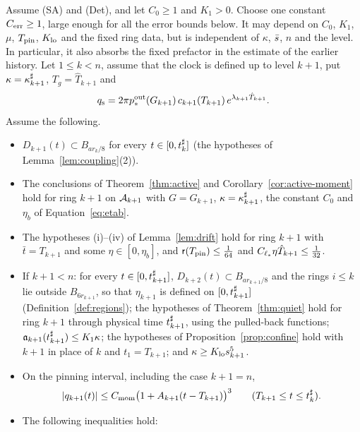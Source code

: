 \begin{lemma}
\label{lem:kicktrue}
Assume (SA) and (Det), and let $C_0\ge1$ and $K_1>0$.
Choose one constant $C_{\mathrm{err}}\ge1$, large enough for all the error bounds below.
It may depend on $C_0$, $K_1$, $\mu$, $T_{\mathrm{pin}}$, $K_{\mathrm{lo}}$ and the fixed ring data,
but is independent of $\kappa$, $\bar s$, $n$ and the level. In particular, it
also absorbs the fixed prefactor in the estimate of the earlier history.
Let $1\le k<n$, assume that
the clock is defined up to level $k+1$, put $\kappa=\kappa^\sharp_{k+1}$,
$T_g=\hat T_{k+1}$ and
\begin{equation}
\label{eq:kicktrue-moment}
q_{\mathrm{s}}=2\pi p^{\mathrm{out}}_*(G_{k+1})\,c_{k+1}(T_{k+1})\,e^{\lambda_{k+1}\hat T_{k+1}} .
\end{equation}
Assume the following.
\begin{itemize}
\item $D_{k+1}(t)\subset B_{ar_k/8}$ for every $t\in[0,t^\sharp_k]$ (the hypotheses
  of Lemma~\ref{lem:coupling}\textup{(2)}).
\item The conclusions of Theorem~\ref{thm:active} and
  Corollary~\ref{cor:active-moment} hold for ring $k+1$ on $\mathcal{A}_{k+1}$ with
  $G=G_{k+1}$, $\kappa=\kappa^\sharp_{k+1}$, the constant $C_0$ and $\eta_b$ of
  Equation~\eqref{eq:etab}.
\item The hypotheses \textup{(i)}--\textup{(iv)} of Lemma~\ref{lem:drift} hold for
  ring $k+1$ with $\bar t=T_{k+1}$ and some $\eta\in[0,\eta_b]$, and
  $\mathsf{r}(T_{\mathrm{pin}})\le\frac1{64}$ and $C_{\ell_*}\eta\hat T_{k+1}\le\frac1{32}$.
\item If $k+1<n$: for every $t\in[0,t^\sharp_{k+1}]$, $D_{k+2}(t)\subset B_{ar_{k+1}/8}$
  and the rings $i\le k$ lie outside $B_{6r_{k+1}}$, so that $\eta_{k+1}$ is
  defined on $[0,t^\sharp_{k+1}]$ (Definition~\ref{def:regions}); the hypotheses of
  Theorem~\ref{thm:quiet} hold for ring $k+1$ through physical time $t^\sharp_{k+1}$, using the pulled-back functions; $\mathfrak{a}_{k+1}(t^\sharp_{k+1})\le K_1\kappa$;
  the hypotheses of Proposition~\ref{prop:confine} hold with $k+1$ in place of $k$
  and $t_1=T_{k+1}$; and $\kappa\ge K_{\mathrm{lo}} s_{k+1}^5$.
\item On the pinning interval, including the case $k+1=n$,
  \begin{equation}
  \label{eq:kicktrue-tail}
  |q_{k+1}(t)|\le C_{\mathrm{mom}}\big(1+A_{k+1}(t-T_{k+1})\big)^3
  \qquad(T_{k+1}\le t\le t^\sharp_k).
  \end{equation}
\item The following inequalities hold:
\begin{enumerate}[label=\textup{(\alph*)}]

\end{enumerate}
\end{itemize}
\end{lemma}
